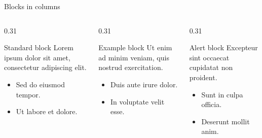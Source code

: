 \begin{frame}[t]{Blocks in columns}
    \begin{columns}[T,onlytextwidth]
        \begin{column}{0.31\textwidth}
            \begin{block}{Standard block}
                Lorem ipsum dolor sit amet, consectetur adipiscing elit.
                \begin{itemize}
                    \item Sed do eiusmod tempor.
                    \item Ut labore et dolore.
                \end{itemize}
            \end{block}
        \end{column}
        \begin{column}{0.31\textwidth}
            \begin{exampleblock}{Example block}
                Ut enim ad minim veniam, quis nostrud exercitation.
                \begin{itemize}
                    \item Duis aute irure dolor.
                    \item In voluptate velit esse.
                \end{itemize}
            \end{exampleblock}
        \end{column}
        \begin{column}{0.31\textwidth}
            \begin{alertblock}{Alert block}
                Excepteur sint occaecat cupidatat non proident.
                \begin{itemize}
                    \item Sunt in culpa officia.
                    \item Deserunt mollit anim.
                \end{itemize}
            \end{alertblock}
        \end{column}
    \end{columns}
\end{frame}
